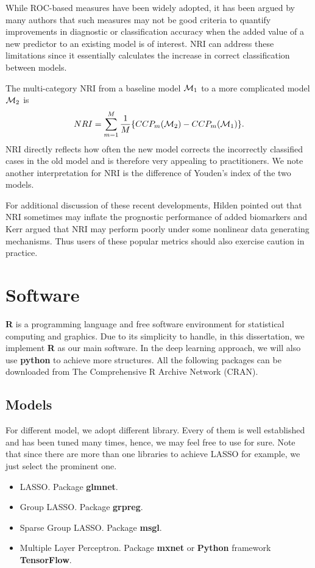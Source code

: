 \documentclass[]{article}
\begin{document}
While ROC-based measures have been widely adopted, it has been argued by many authors that such measures may not be good criteria to quantify improvements in diagnostic or classification accuracy when the added value of a new predictor to an existing model is of interest. NRI can address these limitations since it essentially calculates the increase in correct classification between models.

The multi-category NRI from a baseline model \textit{$ {\cal M}_1 $} to a more complicated model  \textit{$ {\cal M}_2 $} is
\begin{equation}
NRI=\sum_{m=1}^{M}\frac{1}{M}\{CCP_m({\cal M}_2)-CCP_m({\cal M}_1)\}.
\end{equation}
NRI directly reflects how often the new model corrects the incorrectly classified cases in the old model and is therefore very appealing to practitioners. We note another interpretation for NRI is the difference of Youden's index of the two models.

For additional discussion of these recent
developments, Hilden\cite{hilden2014note} pointed out that NRI sometimes may inflate the prognostic performance of added biomarkers and Kerr\cite{kerr2014net} argued that NRI may perform poorly under some nonlinear data generating mechanisms. Thus users of these popular metrics should also exercise caution in practice.


\section{Software}
\textbf{R} is a programming language and free software environment for statistical computing and graphics. Due to its simplicity to handle, in this dissertation, we implement \textbf{R} as our main software. In the deep learning approach, we will also use \textbf{python} to achieve more structures. All the following packages can be downloaded from The Comprehensive R Archive Network (CRAN).
\subsection{Models}
For different model, we adopt different library. Every of them is well established and has been tuned many times, hence, we may feel free to use for sure. Note that since there are more than one libraries to achieve LASSO for example, we just select the prominent one.
\begin{itemize}
	\item LASSO. Package \textbf{glmnet}.
	\item Group LASSO. Package \textbf{grpreg}.
	\item Sparse Group LASSO. Package \textbf{msgl}.
	\item Multiple Layer Perceptron. Package \textbf{mxnet} or \textbf{Python} framework \textbf{TensorFlow}.
\end{itemize}
\end{document}
